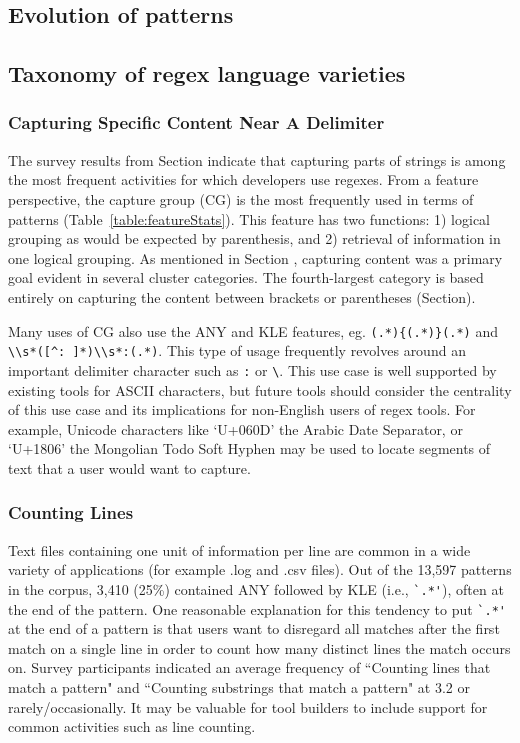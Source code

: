 \subsection{Evolution of patterns}
\subsection{Taxonomy of regex language varieties}

\subsubsection{Capturing Specific Content Near A Delimiter}
The survey results from Section
 indicate that capturing parts of strings is among the most frequent activities for which developers use regexes.
From a feature perspective, the capture group (CG) is the most frequently used in terms of patterns (Table~\ref{table:featureStats}).  This feature has two functions: 1) logical grouping as would be expected by parenthesis, and 2) retrieval of information in one logical grouping.  As mentioned in Section
, capturing content was a primary goal evident in several cluster categories.  The fourth-largest category is based entirely on capturing the content between brackets or parentheses (Section).

Many uses of CG also use the ANY and KLE features, eg. \verb!(.*){(.*)}(.*)! and \verb!\\s*([^: ]*)\\s*:(.*)!.  This type of usage frequently revolves around an important delimiter character such as \verb!:! or \verb!\!.  This use case is well supported by existing tools for ASCII characters, but future tools should consider the centrality of this use case and its implications for non-English users of regex tools.  For example, Unicode characters like `U+060D' the Arabic Date Separator, or `U+1806' the Mongolian Todo Soft Hyphen may be used to locate segments of text that a user would want to capture.


\subsubsection{Counting Lines}
Text files containing one unit of information per line are common in a wide variety of applications (for example .log and .csv files).  Out of the 13,597 patterns in the corpus, 3,410 (25\%) contained ANY followed by KLE  (i.e., \verb!`.*'!), often at the end of the pattern.
One reasonable explanation for this tendency to put \verb!`.*'! at the end of a pattern is that users want to disregard all matches after the first match on a single line in order to count how many distinct lines the match occurs on.  Survey participants indicated an average frequency of ``Counting lines that match a pattern" and ``Counting substrings that match a pattern" at 3.2 or rarely/occasionally. It may be valuable for tool builders to include support for common activities such as line counting.


